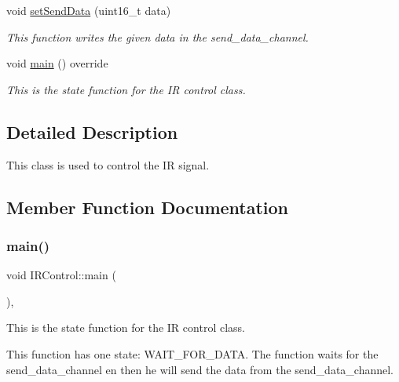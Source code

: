 \begin{DoxyCompactItemize}
\mbox{\label{class_i_r_control_aeb6e04f6fb5260ed9d8b6b33eac42c37}} 
void \mbox{\hyperlink{class_i_r_control_aeb6e04f6fb5260ed9d8b6b33eac42c37}{set\+Send\+Data}} (uint16\+\_\+t data)
\begin{DoxyCompactList}\small\item\em This function writes the given data in the send\+\_\+data\+\_\+channel. \end{DoxyCompactList}\item 
void \mbox{\hyperlink{class_i_r_control_a015c547c9a8a37bc99fc3f98190b6787}{main}} () override
\begin{DoxyCompactList}\small\item\em This is the state function for the IR control class. \end{DoxyCompactList}\end{DoxyCompactItemize}


\subsection{Detailed Description}
This class is used to control the IR signal. 

\subsection{Member Function Documentation}
\mbox{\label{class_i_r_control_a015c547c9a8a37bc99fc3f98190b6787}} 
\subsubsection{\texorpdfstring{main()}{main()}\hspace{0.1cm}{\footnotesize\ttfamily [1/2]}}
{\footnotesize\ttfamily void I\+R\+Control\+::main (\begin{DoxyParamCaption}{ }\end{DoxyParamCaption})\hspace{0.3cm}{\ttfamily [inline]}, {\ttfamily [override]}}



This is the state function for the IR control class. 

This function has one state\+: W\+A\+I\+T\+\_\+\+F\+O\+R\+\_\+\+D\+A\+TA. The function waits for the send\+\_\+data\+\_\+channel en then he will send the data from the send\+\_\+data\+\_\+channel. \mbox{\label{class_i_r_control_a015c547c9a8a37bc99fc3f98190b6787}} 
